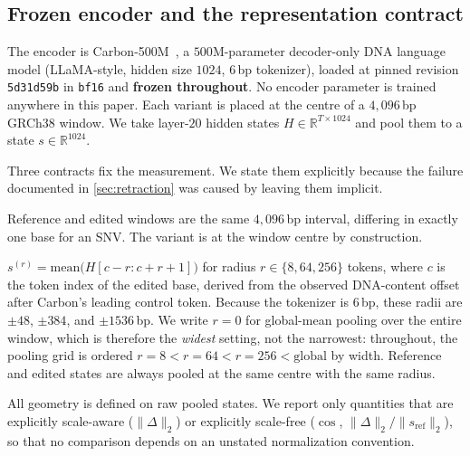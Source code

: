 \documentclass{article}
\newcommand{\Real}{\mathbb{R}}
\newcommand{\sref}{s_{\mathrm{ref}}}
\newcommand{\D}{\Delta}
\newcommand{\carbon}{Carbon-500M\xspace}
\begin{document}
\subsection{Frozen encoder and the representation contract}
The encoder is \carbon~\citep{carbon500m}, a $500$M-parameter decoder-only DNA language model
(LLaMA-style, hidden size $1024$, $6$\,bp tokenizer), loaded at pinned revision \texttt{5d31d59b}
in \texttt{bf16} and \textbf{frozen throughout}. No encoder parameter is trained anywhere in this
paper. Each variant is placed at the centre of a $4{,}096$\,bp GRCh38 window. We take layer-$20$
hidden states $H\in\Real^{T\times 1024}$ and pool them to a state $s\in\Real^{1024}$.

Three contracts fix the measurement. We state them explicitly because the failure documented in
\cref{sec:retraction} was caused by leaving them implicit.
\begin{description}[leftmargin=1.2em,itemsep=1pt,topsep=2pt]
\item[Window.] Reference and edited windows are the same $4{,}096$\,bp interval, differing in
exactly one base for an SNV. The variant is at the window centre by construction.
\item[Pooling.] $s^{(r)}=\mathrm{mean}\big(H[c-r:c+r+1]\big)$ for radius $r\in\{8,64,256\}$ tokens,
where $c$ is the token index of the edited base, derived from the observed DNA-content offset after
Carbon's leading control token. Because the tokenizer is $6$\,bp, these radii are $\pm48$, $\pm384$,
and $\pm1536$\,bp. We write $r{=}0$ for global-mean pooling over the entire window, which is
therefore the \emph{widest} setting, not the narrowest: throughout, the pooling grid is ordered
$r{=}8 < r{=}64 < r{=}256 < \text{global}$ by width. Reference and edited states are always pooled
at the same centre with the same radius.
\item[Normalization.] All geometry is defined on raw pooled states. We report only quantities that
are explicitly scale-aware ($\lVert\D\rVert_2$) or explicitly scale-free ($\cos$,
$\lVert\D\rVert_2/\lVert\sref\rVert_2$), so that no comparison depends on an unstated normalization
convention.
\end{description}
\end{document}
